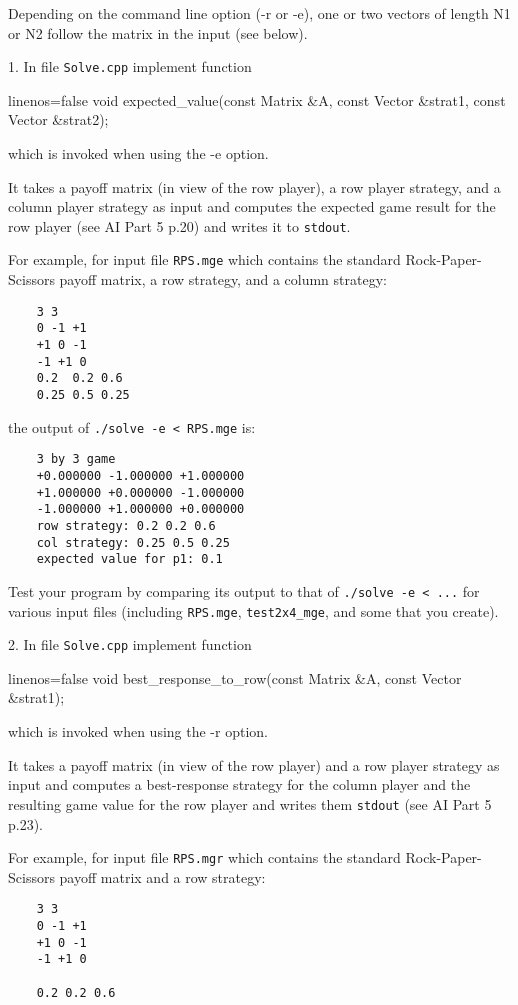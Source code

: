 \documentclass[a4paper,11pt]{article}
\begin{document}
Depending on the command line option (-r or -e), one or two
vectors of length N1 or N2 follow the matrix in the input (see below).

\linerule

1. In file \texttt{Solve.cpp} implement function
\begin{cppcode*}{linenos=false}
void expected_value(const Matrix &A, const Vector &strat1, const Vector &strat2);
\end{cppcode*}
which is invoked when using the -e option. 


It takes a payoff matrix (in view of the row player), a row player strategy,
and a column player strategy as input and computes the expected game result
for the row player (see AI Part 5 p.20) and writes it to \texttt{stdout}.

For example, for input file \texttt{RPS.mge} which contains the standard
Rock-Paper-Scissors payoff matrix, a row strategy, and a column strategy:
{\small 
\begin{verbatim}
    3 3
    0 -1 +1
    +1 0 -1
    -1 +1 0
    0.2  0.2 0.6
    0.25 0.5 0.25
\end{verbatim}
}

the output of \texttt{./solve -e < RPS.mge} is:
{\small 
\begin{verbatim}
    3 by 3 game
    +0.000000 -1.000000 +1.000000 
    +1.000000 +0.000000 -1.000000 
    -1.000000 +1.000000 +0.000000 
    row strategy: 0.2 0.2 0.6
    col strategy: 0.25 0.5 0.25
    expected value for p1: 0.1
\end{verbatim}
}

Test your program by comparing its output to that of \texttt{./solve -e < ...} for
various input files (including \texttt{RPS.mge}, \texttt{test2x4\_mge}, and some that you create).

\linerule

2. In file \texttt{Solve.cpp} implement function
\begin{cppcode*}{linenos=false}
void best_response_to_row(const Matrix &A, const Vector &strat1);
\end{cppcode*}
which is invoked when using the -r option.

It takes a payoff matrix (in view of the row player) and a row player
strategy as input and computes a best-response strategy for the column
player and the resulting game value for the row player and writes them \texttt{stdout} (see AI
Part 5 p.23).

For example, for input file \texttt{RPS.mgr} which contains the standard
Rock-Paper-Scissors payoff matrix and a row strategy:
{\small 
\begin{verbatim}
    3 3
    0 -1 +1
    +1 0 -1
    -1 +1 0
    
    0.2 0.2 0.6
\end{verbatim}
}
\end{document}
